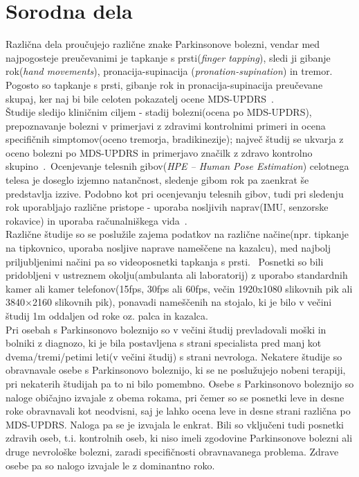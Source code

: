 \documentclass[a4paper,12pt]{article}  %
\begin{document}
\section{Sorodna dela}

Različna dela proučujejo različne znake Parkinsonove bolezni, vendar med najpogosteje preučevanimi je 
tapkanje s prsti(\textit{finger tapping}), sledi ji gibanje rok(\textit{hand movements}), pronacija-supinacija 
(\textit{pronation-supination}) in tremor. Pogosto so tapkanje s prsti, gibanje rok in pronacija-supinacija 
preučevane skupaj, ker naj bi bile celoten pokazatelj ocene MDS-UPDRS~\cite{Manzanera}. \\

Študije sledijo kliničnim ciljem - stadij bolezni(ocena po MDS-UPDRS), prepoznavanje bolezni v primerjavi z 
zdravimi kontrolnimi primeri in ocena specifičnih simptomov(oceno tremorja, bradikinezije); največ študij 
se ukvarja z oceno bolezni po MDS-UPDRS in primerjavo značilk z zdravo kontrolno skupino~\cite{Amo-Salas}.\
Ocenjevanje telesnih gibov(\textit{HPE – Human Pose Estimation}) celotnega telesa je doseglo izjemno natančnost, 
sledenje gibom rok pa zaenkrat še predstavlja izzive. Podobno kot pri ocenjevanju telesnih gibov, tudi pri 
sledenju rok uporabljajo različne pristope - uporaba nosljivih naprav(IMU, senzorske rokavice) in uporaba 
računalniškega vida~\cite{Amprimoa}. \\


Različne študije so se poslužile zajema podatkov na različne načine(npr. tipkanje na tipkovnico, uporaba 
nosljive naprave nameščene na kazalcu), med najbolj priljubljenimi načini pa so videoposnetki tapkanja s prsti. \
Posnetki so bili pridobljeni v ustreznem okolju(ambulanta ali laboratorij) z uporabo standardnih kamer ali 
kamer telefonov(15fps, 30fps ali 60fps, večin 1920x1080 slikovnih pik ali 3840$\times$2160 slikovnih pik), 
ponavadi nameščenih na stojalo, ki je bilo v večini študij 1m oddaljen od roke oz. palca in kazalca.\\

Pri osebah s Parkinsonovo boleznijo so v večini študij prevladovali moški in bolniki z diagnozo, ki je bila 
postavljena s strani specialista pred manj kot dvema/tremi/petimi leti(v večini študij) s strani nevrologa. 
Nekatere študije so obravnavale osebe s Parkinsonovo boleznijo, ki se ne poslužujejo nobeni terapiji, pri 
nekaterih študijah pa to ni bilo pomembno. Osebe s Parkinsonovo boleznijo so naloge običajno izvajale z 
obema rokama, pri čemer so se posnetki leve in desne roke obravnavali kot neodvisni, saj je lahko ocena 
leve in desne strani različna po MDS-UPDRS. Naloga pa se je izvajala le enkrat. Bili so vključeni tudi 
posnetki zdravih oseb, t.i. kontrolnih oseb, ki niso imeli zgodovine Parkinsonove bolezni ali druge 
nevrološke bolezni, zaradi specifičnosti obravnavanega problema. Zdrave osebe pa so nalogo izvajale le z 
dominantno roko. \\
\end{document}
